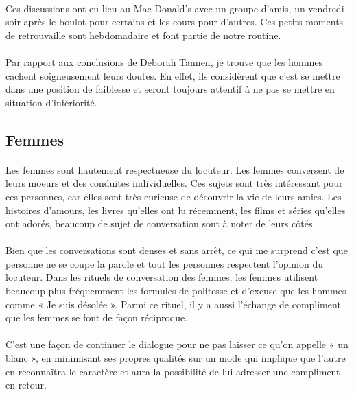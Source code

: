 \paragraph{}
Ces discussions ont eu lieu au Mac Donald's avec un groupe d'amis, un vendredi soir après le boulot pour
certains et les cours pour d'autres. Ces petits moments de retrouvaille sont hebdomadaire et font partie de
notre routine.

\paragraph{}
Par rapport aux conclusions de Deborah Tannen, je trouve que les hommes cachent soigneusement leurs
doutes. En effet, ils considèrent que c'est se mettre dans une position de faiblesse et seront toujours attentif à
ne pas se mettre en situation d'infériorité.

\subsection{Femmes}
\paragraph{}
Les femmes sont hautement respectueuse du locuteur. Les femmes conversent de leurs moeurs et des
conduites individuelles. Ces sujets sont très intéressant pour ces personnes, car elles sont très curieuse de
découvrir la vie de leurs amies. Les histoires d'amours, les livres qu'elles ont lu récemment, les films et séries
qu'elles ont adorés, beaucoup de sujet de conversation sont à noter de leurs côtés.

\paragraph{}
Bien que les conversations sont denses et sans arrêt, ce qui me surprend c'est que personne ne se coupe la
parole et tout les personnes respectent l'opinion du locuteur. Dans les rituels de conversation des femmes, les
femmes utilisent beaucoup plus fréquemment les formules de politesse et d'excuse que les hommes comme
« Je suis désolée ». Parmi ce rituel, il y a aussi l'échange de compliment que les femmes se font de façon
réciproque.

\paragraph{}
C'est une façon de continuer le dialogue pour ne pas laisser ce qu'on appelle « un blanc », en minimisant ses
propres qualités sur un mode qui implique que l'autre en reconnaîtra le caractère et aura la possibilité de lui
adresser une compliment en retour.

